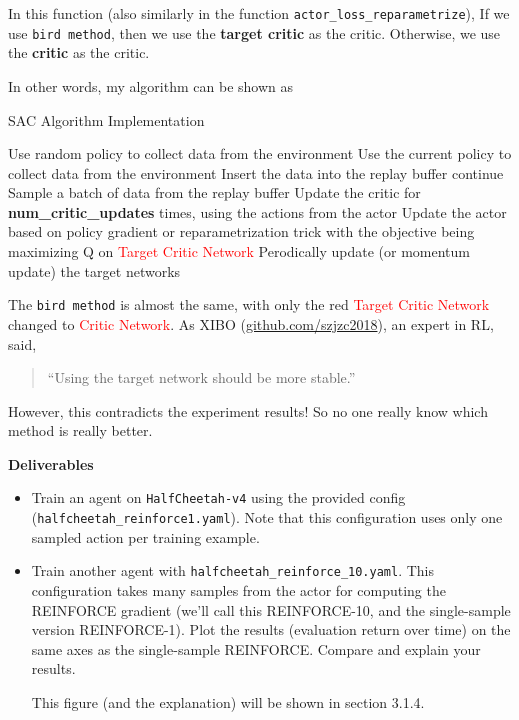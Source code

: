 In this function (also similarly in the function \verb|actor_loss_reparametrize|), If we use \verb|bird method|, then we use the \textbf{target critic} as the critic. Otherwise, we use the \textbf{critic} as the critic. 

In other words, my algorithm can be shown as

\begin{algorithm}[H]
    \caption{SAC Algorithm Implementation}
    \label{alg:sac}
    \begin{algorithmic}[1]
                \State Use random policy to collect data from the environment
            \Else
                \State Use the current policy to collect data from the environment
            \EndIf
            \State Insert the data into the replay buffer
                \State continue
            \EndIf
            \State Sample a batch of data from the replay buffer
            \State Update the critic for \textbf{num\_critic\_updates} times, using the actions from the actor
            \State Update the actor based on policy gradient or reparametrization trick with the objective being maximizing Q on \textcolor{red}{Target Critic Network}
            \State Perodically update (or momentum update) the target networks
        \EndFor
    \end{algorithmic}	
\end{algorithm}

The \verb|bird method| is almost the same, with only the red \textcolor{red}{Target Critic Network} changed to \textcolor{red}{Critic Network}. As XIBO (\url{github.com/szjzc2018}), an expert in RL, said,

\begin{quotation}
``Using the target network should be more stable.''
\end{quotation}

However, this contradicts the experiment results! So no one really know which method is really better.
    
\textbf{Deliverables}
\begin{itemize}
    \item Train an agent on \verb|HalfCheetah-v4| using the provided config (\verb|halfcheetah_reinforce1.yaml|). Note that this configuration uses only one sampled action per training example.
    \item Train another agent with \verb|halfcheetah_reinforce_10.yaml|. This configuration takes many samples from the actor for computing the REINFORCE gradient (we'll call this REINFORCE-10, and the single-sample version REINFORCE-1). Plot the results (evaluation return over time) on the same axes as the single-sample REINFORCE. Compare and explain your results.

\MYSOLUTION This figure (and the explanation) will be shown in section 3.1.4.
\end{itemize}


